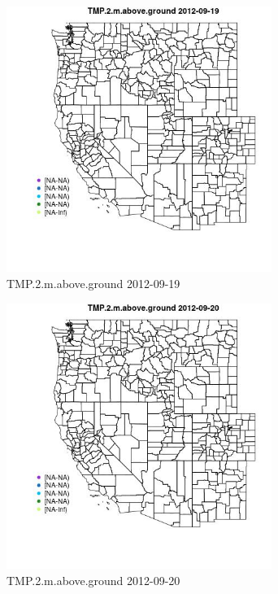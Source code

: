 \begin{figure} 
\centering  
\includegraphics[width=0.77\textwidth]{Code_Outputs/ML_input_report_ML_input_PM25_Step5_part_d_de_duplicated_aves_ML_input_MapObsTMP2maboveground2012-09-19.jpg} 
\caption{\label{fig:ML_input_report_ML_input_PM25_Step5_part_d_de_duplicated_aves_ML_inputMapObsTMP2maboveground2012-09-19}TMP.2.m.above.ground 2012-09-19} 
\end{figure} 
 

\begin{figure} 
\centering  
\includegraphics[width=0.77\textwidth]{Code_Outputs/ML_input_report_ML_input_PM25_Step5_part_d_de_duplicated_aves_ML_input_MapObsTMP2maboveground2012-09-20.jpg} 
\caption{\label{fig:ML_input_report_ML_input_PM25_Step5_part_d_de_duplicated_aves_ML_inputMapObsTMP2maboveground2012-09-20}TMP.2.m.above.ground 2012-09-20} 
\end{figure} 
 

